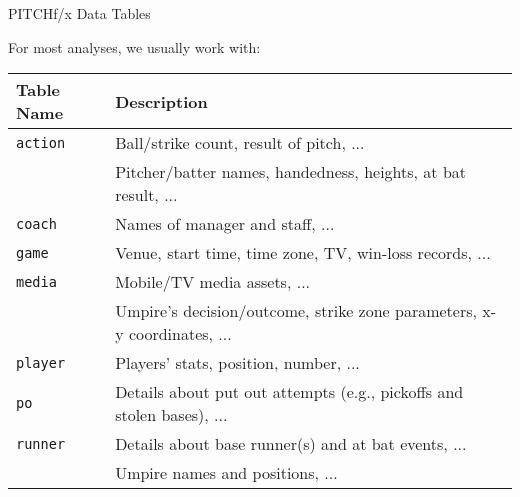 \begin{frame}{PITCHf/x Data Tables}

For most analyses, we usually work with:

\small

\begin{table}[ht]
\centering
\begin{tabular}{ll}
\hline
Table Name & Description \\ 
\hline
{\texttt{action}} & Ball/strike count, result of pitch, ... \\ 
\rowcolor{SpringGreen}{\texttt{atbat}} & Pitcher/batter names, handedness, heights, at bat result, ... \\ 
{\texttt{coach}} & Names of manager and staff, ... \\ 
{\texttt{game}} & Venue, start time, time zone, TV, win-loss records, ... \\ 
{\texttt{media}} & Mobile/TV media assets, ... \\ 
\rowcolor{SpringGreen}{\texttt{pitch}} & Umpire's decision/outcome, strike zone parameters, x-y coordinates, ... \\ 
{\texttt{player}} & Players' stats, position, number, ... \\ 
{\texttt{po}} & Details about put out attempts (e.g., pickoffs and stolen bases), ... \\ 
{\texttt{runner}} & Details about base runner(s) and at bat events, ... \\ 
\rowcolor{SpringGreen}{\texttt{umpire}} & Umpire names and positions, ... \\ 
\hline
\end{tabular}
\end{table}

\end{frame}

